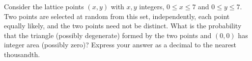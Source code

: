 Consider the lattice points $(x,y)$ with $x,y$ integers, $0\le x\le7$ and $0\le y\le7$. Two points are selected at random from this set, independently, each point equally likely, and the two points need not be distinct. What is the probability that the triangle (possibly degenerate) formed by the two points and $(0,0)$ has integer area (possibly zero)? Express your answer as a decimal to the nearest thousandth.

